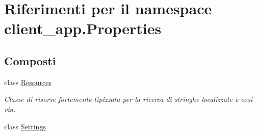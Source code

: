 \hypertarget{namespaceclient__app_1_1_properties}{}\section{Riferimenti per il namespace client\+\_\+app.\+Properties}
\label{namespaceclient__app_1_1_properties}
\subsection*{Composti}
\begin{DoxyCompactItemize}
\item 
class \mbox{\hyperlink{classclient__app_1_1_properties_1_1_resources}{Resources}}
\begin{DoxyCompactList}\small\item\em Classe di risorse fortemente tipizzata per la ricerca di stringhe localizzate e così via. \end{DoxyCompactList}\item 
class \mbox{\hyperlink{classclient__app_1_1_properties_1_1_settings}{Settings}}
\end{DoxyCompactItemize}
